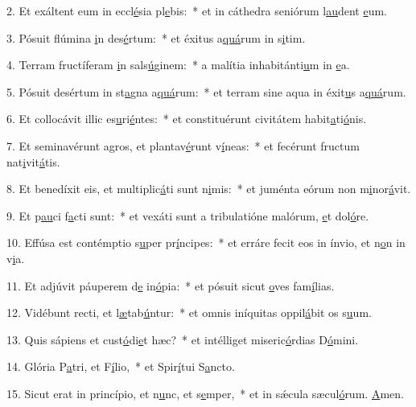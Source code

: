 2. Et exáltent eum in eccl\uline{é}sia pl\uline{e}bis:~* et in cáthedra seniórum l\uline{au}dent \uline{e}um.\par 
3. Pósuit flúmina \uline{i}n des\uline{é}rtum:~* et éxitus a\uline{quá}rum in s\uline{i}tim.\par 
4. Terram fructíferam \uline{i}n sals\uline{ú}ginem:~* a malítia inhabitánti\uline{u}m in \uline{e}a.\par 
5. Pósuit desértum in st\uline{a}gna a\uline{quá}rum:~* et terram sine aqua in éxit\uline{u}s a\uline{quá}rum.\par 
6. Et collocávit illic es\uline{u}ri\uline{é}ntes:~* et constituérunt civitátem habit\uline{a}ti\uline{ó}nis.\par 
7. Et seminavérunt agros, et plantav\uline{é}runt v\uline{í}neas:~* et fecérunt fructum nat\uline{i}vit\uline{á}tis.\par 
8. Et benedíxit eis, et multiplic\uline{á}ti sunt n\uline{i}mis:~* et juménta eórum non m\uline{i}nor\uline{á}vit.\par 
9. Et p\uline{au}ci f\uline{a}cti sunt:~* et vexáti sunt a tribulatióne malórum, \uline{e}t dol\uline{ó}re.\par 
10. Effúsa est contémptio s\uline{u}per pr\uline{í}ncipes:~* et erráre fecit eos in ínvio, et n\uline{o}n in v\uline{i}a.\par 
11. Et adjúvit páuperem d\uline{e} in\uline{ó}pia:~* et pósuit sicut \uline{o}ves fam\uline{í}lias.\par 
12. Vidébunt recti, et l\uline{æ}tab\uline{ú}ntur:~* et omnis iníquitas oppil\uline{á}bit os s\uline{u}um.\par 
13. Quis sápiens et cust\uline{ó}di\uline{e}t hæc?~* et intélliget miseric\uline{ó}rdias D\uline{ó}mini.\par 
14. Glória P\uline{a}tri, et F\uline{í}lio,~* et Spir\uline{í}tui S\uline{a}ncto.\par 
15. Sicut erat in princípio, et n\uline{u}nc, et s\uline{e}mper,~* et in sǽcula sæcul\uline{ó}rum. \uline{A}men.\par 

